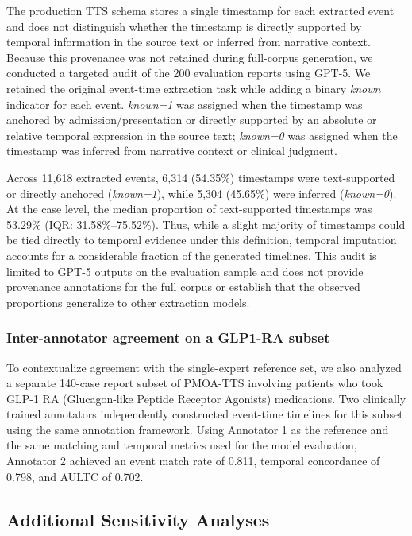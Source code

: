 \documentclass[pdflatex,sn-mathphys-num]{sn-jnl}%
\newif\ifshowrebuttalcolor
\newcommand{\rebuttal}[1]{%
  \ifshowrebuttalcolor
    \textcolor{rebuttalblue}{#1}%
  \else
    #1%
  \fi
}
\theoremstyle{thmstyleone}%
\theoremstyle{thmstyletwo}%
\theoremstyle{thmstylethree}%
\begin{document}
\rebuttal{
The production TTS schema stores a single timestamp for each extracted event and does not distinguish whether the timestamp is directly supported by temporal information in the source text or inferred from narrative context. Because this provenance was not retained during full-corpus generation, we conducted a targeted audit of the 200 evaluation reports using GPT-5. We retained the original event-time extraction task while adding a binary \emph{known} indicator for each event. \emph{known=1} was assigned when the timestamp was anchored by admission/presentation or directly supported by an absolute or relative temporal expression in the source text; \emph{known=0} was assigned when the timestamp was inferred from narrative context or clinical judgment.
}

\rebuttal{
Across 11,618 extracted events, 6,314 (54.35\%) timestamps were text-supported or directly anchored (\emph{known=1}), while 5,304 (45.65\%) were inferred (\emph{known=0}). At the case level, the median proportion of text-supported timestamps was 53.29\% (IQR: 31.58\%--75.52\%). Thus, while a slight majority of timestamps could be tied directly to temporal evidence under this definition, temporal imputation accounts for a considerable fraction of the generated timelines. This audit is limited to GPT-5 outputs on the evaluation sample and does not provide provenance annotations for the full corpus or establish that the observed proportions generalize to other extraction models.
}

\subsubsection{Inter-annotator agreement on a GLP1-RA subset}
\label{glp_iaa}

\rebuttal{To contextualize agreement with the single-expert reference set, we also analyzed a separate 140-case report subset of PMOA-TTS involving patients who took GLP-1 RA (Glucagon-like Peptide Receptor Agonists) medications. Two clinically trained annotators independently constructed event-time timelines for this subset using the same annotation framework. Using Annotator 1 as the reference and the same matching and temporal metrics used for the model evaluation, Annotator 2 achieved an event match rate of 0.811, temporal concordance of 0.798, and AULTC of 0.702.}

\subsection{Additional Sensitivity Analyses}
\label{sec:additional-sensitivity-analyses}
\end{document}
